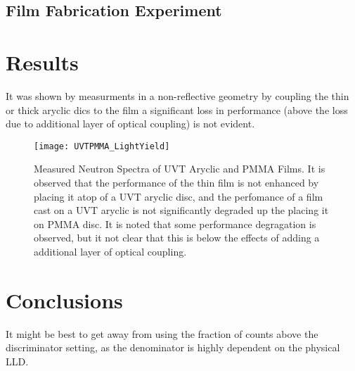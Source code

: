 \documentclass[draftcls,onecolumn]{IEEEtran}
\begin{document}
\subsection{Film Fabrication Experiment}

\section{Results}

It was shown by measurments in a non-reflective geometry by coupling the thin or thick aryclic dics to the film a significant loss in performance (above the loss due to additional layer of optical coupling) is not evident.
\begin{figure}
  \centering
  \texttt{[image: UVTPMMA\_LightYield]}
  \caption[Measured Effect of UVT Aryclic and PMMA]{Measured Neutron Spectra of UVT Aryclic and PMMA Films. It is observed that the performance of the thin film is not enhanced by placing it atop of a UVT aryclic disc, and the perfomance of a film cast on a UVT aryclic is not significantly degraded up the placing it on PMMA disc. It is noted that some performance degragation is observed, but it not clear that this is below the effects of adding a additional layer of optical coupling.}
  \label{fig:RadMeasuredExper}
\end{figure}

\section{Conclusions}

It might be best to get away from using the fraction of counts above the discriminator setting, as the denominator is highly dependent on the physical LLD.
\end{document}
